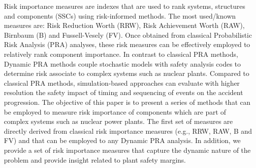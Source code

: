 Risk importance measures are indexes that are used to rank systems, 
structures and components (SSCs) using risk-informed methods. 
The most used/known measures are: Risk Reduction Worth (RRW), 
Risk Achievement Worth (RAW), Birnbaum (B) and Fussell-Vesely (FV). 
Once obtained from classical Probabilistic Risk Analysis (PRA) analyses, 
these risk measures can be effectively employed to relatively rank
component importance.
In contrast to classical PRA methods, 
Dynamic PRA methods couple stochastic models with safety analysis 
codes to determine risk associate to complex systems such as nuclear 
plants. Compared to classical PRA methods, simulation-based approaches
can evaluate with 
higher resolution the safety impact of timing and sequencing of events 
on the accident progression. 
The objective of this paper is to present a series of methods that 
can be employed to measure risk importance of components which are 
part of complex systems such as nuclear power plants.
The first set of measures are directly derived from classical risk 
importance measures (e.g., RRW, RAW, B and FV) and that can be employed
to any Dynamic PRA analysis.
In addition, we provide a set of risk importance measures that capture the 
dynamic nature of the problem and provide insight related to plant safety 
margins.

